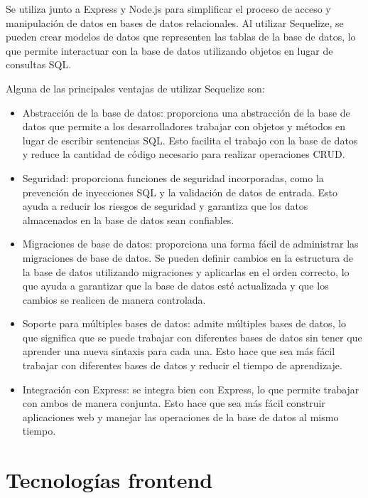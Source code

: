 Se utiliza junto a Express y Node.js para simplificar el proceso de acceso y manipulación de datos en bases de datos relacionales. Al utilizar Sequelize, se pueden crear modelos de datos que representen las tablas de la base de datos, lo que permite interactuar con la base de datos utilizando objetos en lugar de consultas SQL.

Alguna de las principales ventajas de utilizar Sequelize son:

\begin{itemize}
\item Abstracción de la base de datos: proporciona una abstracción de la base de datos que permite a los desarrolladores trabajar con objetos y métodos en lugar de escribir sentencias SQL. Esto facilita el trabajo con la base de datos y reduce la cantidad de código necesario para realizar operaciones CRUD.

\item Seguridad: proporciona funciones de seguridad incorporadas, como la prevención de inyecciones SQL y la validación de datos de entrada. Esto ayuda a reducir los riesgos de seguridad y garantiza que los datos almacenados en la base de datos sean confiables.

\item Migraciones de base de datos: proporciona una forma fácil de administrar las migraciones de base de datos. Se pueden definir cambios en la estructura de la base de datos utilizando migraciones y aplicarlas en el orden correcto, lo que ayuda a garantizar que la base de datos esté actualizada y que los cambios se realicen de manera controlada.

\item Soporte para múltiples bases de datos: admite múltiples bases de datos, lo que significa que se puede trabajar con diferentes bases de datos sin tener que aprender una nueva sintaxis para cada una. Esto hace que sea más fácil trabajar con diferentes bases de datos y reducir el tiempo de aprendizaje.

\item Integración con Express: se integra bien con Express, lo que permite trabajar con ambos de manera conjunta. Esto hace que sea más fácil construir aplicaciones web y manejar las operaciones de la base de datos al mismo tiempo.

\end{itemize}

\section{Tecnologías frontend}
\label{sec:frontend}

